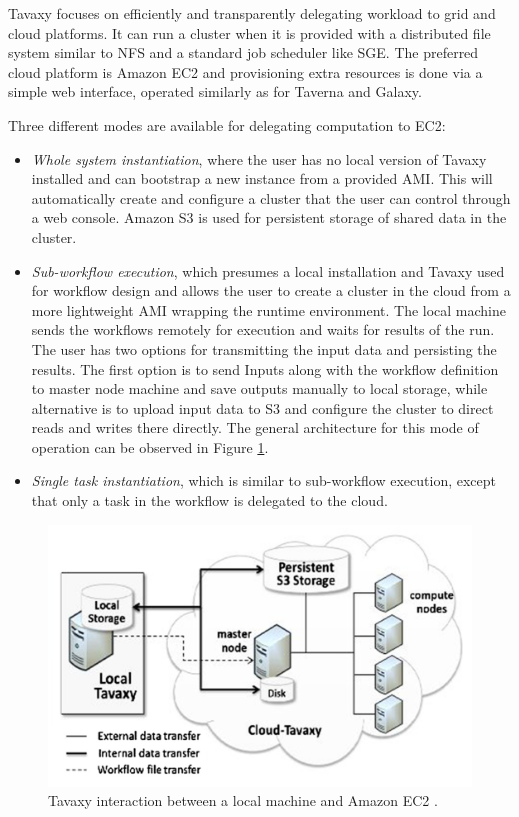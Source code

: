 \documentclass[11pt,a4paper]{report}
\begin{document}
Tavaxy focuses on efficiently and transparently delegating workload to grid and cloud platforms. It can run a cluster when it is provided with a distributed file system similar to NFS and a standard job scheduler like SGE. The preferred cloud platform is Amazon EC2 and provisioning extra resources is done via a simple web interface, operated similarly as for Taverna and Galaxy.

Three different modes are available for delegating computation to EC2:

\begin{itemize}
	\item \textit{Whole system instantiation}, where the user has no local version of Tavaxy installed and can bootstrap a new instance from a provided AMI. This will automatically create and configure a cluster that the user can control through a web console. Amazon S3 \cite{S3} is used for persistent storage of shared data in the cluster.
	\item \textit{Sub-workflow execution}, which presumes a local installation and Tavaxy used for workflow design and allows the user to create a cluster in the cloud from a more lightweight AMI wrapping the runtime environment. The local machine sends the workflows remotely for execution and waits for results of the run. The user has two options for transmitting the input data and persisting the results. The first option is to send Inputs along with the workflow definition to master node machine and save outputs manually to local storage, while alternative is to upload input data to S3 and configure the cluster to direct reads and writes there directly. The general architecture for this mode of operation can be observed in Figure \ref{TavaxyArch}.
	\item \textit{Single task instantiation}, which is similar to sub-workflow execution, except that only a task in the workflow is delegated to the cloud.
\end{itemize}

\vspace{5mm}
\begin{figure}[h]
	\centering
		\includegraphics[scale=0.25]{figures/TavaxyArch.png}
	\caption{Tavaxy interaction between a local machine and Amazon EC2 \cite{Abouelhoda2012}.}
	\label{TavaxyArch}
\end{figure}
\end{document}
